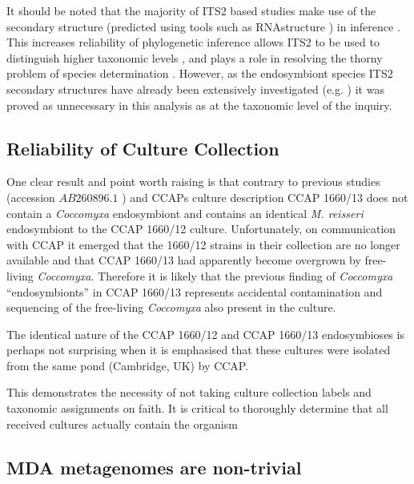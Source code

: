 It should be noted that the majority of ITS2 based studies make use of the secondary structure (predicted
using tools such as RNAstructure \citep{Mathews2004}) in inference \citep{Schultz2009}. 
This increases reliability of phylogenetic inference \citep{Keller2008} allows ITS2 to be used
to distinguish higher taxonomic levels \citep{Coleman2003}, and plays a role
in resolving the thorny problem of species determination \citep{Muller2007}. 
However, as the endosymbiont species ITS2 secondary structures have already been extensively
investigated (e.g. \citep{Hoshina2008,Hoshina2010}) it was proved as unnecessary 
in this analysis as at the taxonomic level of the inquiry. 

\subsection{Reliability of Culture Collection}

One clear result and point worth raising is that contrary to previous studies 
(accession \(AB260896.1\) \citep{Hoshina2008}) and CCAPs culture description 
CCAP 1660/13 does not contain a \textit{Coccomyxa} endosymbiont and contains 
an identical \textit{M. reisseri} endosymbiont to the CCAP 1660/12 culture. 
Unfortunately, on communication with CCAP it emerged that 
the 1660/12 strains in their collection are no longer available
and that CCAP 1660/13 had apparently become overgrown by free-living \textit{Coccomyxa}. 
Therefore it is likely that the previous finding of \textit{Coccomyxa} ``endosymbionts'' in
CCAP 1660/13 \citep{Hoshina2008} represents accidental contamination and sequencing 
of the free-living \textit{Coccomyxa} also present in the culture. 

The identical nature of the CCAP 1660/12 and CCAP 1660/13 endosymbioses is perhaps not surprising
when it is emphasised that these cultures were isolated from the same
pond (Cambridge, UK) by CCAP. 

This demonstrates the necessity of not taking culture collection labels and taxonomic
assignments on faith. It is critical to thoroughly determine that all received
cultures actually contain the organism 

\subsection{MDA metagenomes are non-trivial}

